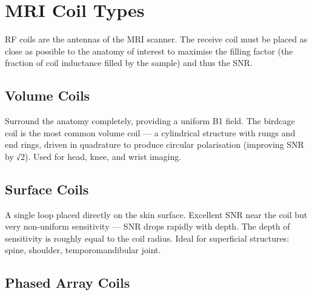 \section{MRI Coil Types}\label{sec:wiki_coil_types}



RF coils are the antennas of the MRI scanner. The receive coil must be placed as close as possible to the anatomy of interest to maximise the filling factor (the fraction of coil inductance filled by the sample) and thus the SNR.

				

\subsection{Volume Coils}

				

Surround the anatomy completely, providing a uniform B1 field. The birdcage coil is the most common volume coil — a cylindrical structure with rungs and end rings, driven in quadrature to produce circular polarisation (improving SNR by √2). Used for head, knee, and wrist imaging.


				

\subsection{Surface Coils}

				


				

A single loop placed directly on the skin surface. Excellent SNR near the coil but very non-uniform sensitivity — SNR drops rapidly with depth. The depth of sensitivity is roughly equal to the coil radius. Ideal for superficial structures: spine, shoulder, temporomandibular joint.

				

\subsection{Phased Array Coils}

				

